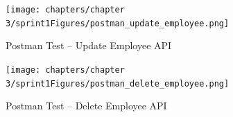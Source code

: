 \begin{figure}[H]
    \centering
    \texttt{[image: chapters/chapter 3/sprint1Figures/postman\_update\_employee.png]}
    \caption{Postman Test -- Update Employee API}
    \label{fig:postman_update_employee}
\end{figure}

\begin{figure}[H]
    \centering
    \texttt{[image: chapters/chapter 3/sprint1Figures/postman\_delete\_employee.png]}
    \caption{Postman Test -- Delete Employee API}
    \label{fig:postman_delete_employee}
\end{figure}
